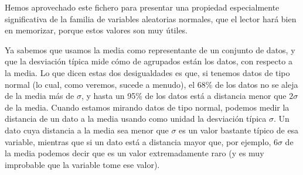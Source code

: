 Hemos aprovechado este fichero para presentar una propiedad especialmente significativa de la familia de variables aleatorias normales, que el lector hará bien en memorizar, porque estos valores son muy útiles.    %
    \begin{center}
    \end{center}
Ya sabemos que usamos la media como representante de un conjunto de datos, y que la desviación típica mide cómo de agrupados están los datos, con respecto a la media. Lo que dicen estas dos desigualdades es que, si tenemos datos de tipo normal (lo cual, como veremos, sucede a menudo), el 68\% de los datos no se aleja de la media más de $\sigma$, y hasta un 95\% de los datos está a distancia menor que $2\sigma$ de la media. Cuando estamos mirando datos de tipo normal, podemos medir la distancia de un dato a la media usando como unidad la desviación típica $\sigma$. Un dato cuya distancia a la media sea menor que $\sigma$ es un valor bastante típico de esa variable, mientras que si un dato está a distancia mayor que, por ejemplo,  $6\sigma$ de la media podemos decir que es un valor extremadamente raro (y es muy improbable que la variable tome ese valor).


